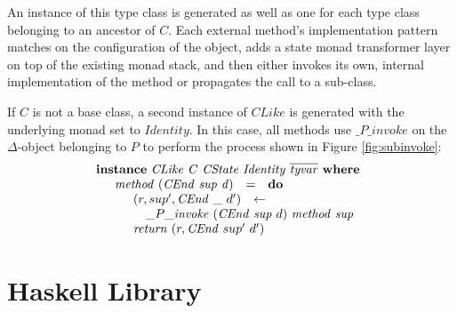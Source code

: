 \documentclass[authoryear,preprint]{sigplanconf}
\begin{document}
An instance of this type class is generated as well as one for each type class belonging to an ancestor of $C$. Each external method's implementation pattern matches on the configuration of the object, adds a state monad transformer layer on top of the existing monad stack, and then either invokes its own, internal implementation of the method or propagates the call to a sub-class.

If $C$ is not a base class, a second instance of $\mathit{CLike}$ is generated with the underlying monad set to $\mathit{Identity}$. In this case, all methods use $\_P\_\mathit{invoke}$ on the $\Delta$-object belonging to $P$ to perform the process shown in Figure \ref{fig:subinvoke}:
\begin{displaymath}
\begin{array}{l}
\mathbf{instance}~\mathit{CLike}~\mathit{C}~\mathit{CState}~\mathit{Identity}~\overline{\mathit{tyvar}}~\mathbf{where}\\
\quad \begin{array}{lcl}
\mathit{method}~(\mathit{CEnd}~\mathit{sup}~\mathit{d}) & = & \mathbf{do} \\
\multicolumn{3}{l}{\quad \begin{array}{lcl}
    (r,sup',\mathit{CEnd}~\_~d') & \leftarrow & \\ 
    \multicolumn{3}{l}{ \quad \_P\_\mathit{invoke}~(\mathit{CEnd}~\mathit{sup}~d)~\mathit{method}~\mathit{sup} }\\
    \multicolumn{3}{l}{\mathit{return}~(r, \mathit{CEnd}~sup'~d')}
    \end{array}}
\end{array}
\end{array}
\end{displaymath}

\section{Haskell Library}
\label{sec:th}
\end{document}
